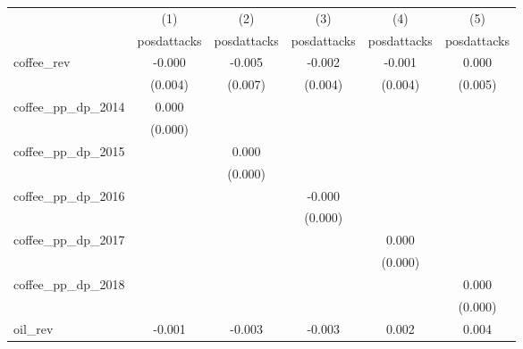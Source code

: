 {
\def\sym#1{\ifmmode^{#1}\else\(^{#1}\)\fi}
\begin{tabular}{l*{5}{c}}
\hline\hline
            &\multicolumn{1}{c}{(1)}&\multicolumn{1}{c}{(2)}&\multicolumn{1}{c}{(3)}&\multicolumn{1}{c}{(4)}&\multicolumn{1}{c}{(5)}\\
            &\multicolumn{1}{c}{posdattacks}&\multicolumn{1}{c}{posdattacks}&\multicolumn{1}{c}{posdattacks}&\multicolumn{1}{c}{posdattacks}&\multicolumn{1}{c}{posdattacks}\\
\hline
coffee\_rev  &      -0.000         &      -0.005         &      -0.002         &      -0.001         &       0.000         \\
            &     (0.004)         &     (0.007)         &     (0.004)         &     (0.004)         &     (0.005)         \\
[1em]
coffee\_pp\_dp\_2014&       0.000         &                     &                     &                     &                     \\
            &     (0.000)         &                     &                     &                     &                     \\
[1em]
coffee\_pp\_dp\_2015&                     &       0.000         &                     &                     &                     \\
            &                     &     (0.000)         &                     &                     &                     \\
[1em]
coffee\_pp\_dp\_2016&                     &                     &      -0.000         &                     &                     \\
            &                     &                     &     (0.000)         &                     &                     \\
[1em]
coffee\_pp\_dp\_2017&                     &                     &                     &       0.000         &                     \\
            &                     &                     &                     &     (0.000)         &                     \\
[1em]
coffee\_pp\_dp\_2018&                     &                     &                     &                     &       0.000         \\
            &                     &                     &                     &                     &     (0.000)         \\
[1em]
oil\_rev     &      -0.001         &      -0.003         &      -0.003         &       0.002         &       0.004         \\

\end{tabular}}
